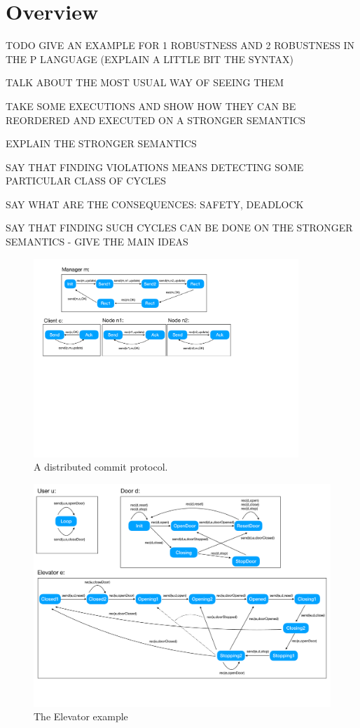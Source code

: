 \section{Overview}

TODO GIVE AN EXAMPLE FOR 1 ROBUSTNESS AND 2 ROBUSTNESS IN THE P LANGUAGE (EXPLAIN A LITTLE BIT THE SYNTAX)

TALK ABOUT THE MOST USUAL WAY OF SEEING THEM

TAKE SOME EXECUTIONS AND SHOW HOW THEY CAN BE REORDERED AND EXECUTED ON A STRONGER SEMANTICS

EXPLAIN THE STRONGER SEMANTICS

SAY THAT FINDING VIOLATIONS MEANS DETECTING SOME PARTICULAR CLASS OF CYCLES

SAY WHAT ARE THE CONSEQUENCES: SAFETY, DEADLOCK

SAY THAT FINDING SUCH CYCLES CAN BE DONE ON THE STRONGER SEMANTICS - GIVE THE MAIN IDEAS

\begin{figure}
\includegraphics[width=10cm]{commit.pdf}
\caption{A distributed commit protocol.}
\label{fig:elevator}
\end{figure}

\begin{figure}
\includegraphics[width=13cm]{elevator.pdf}
\caption{The Elevator example}
\label{fig:elevator}
\end{figure}


